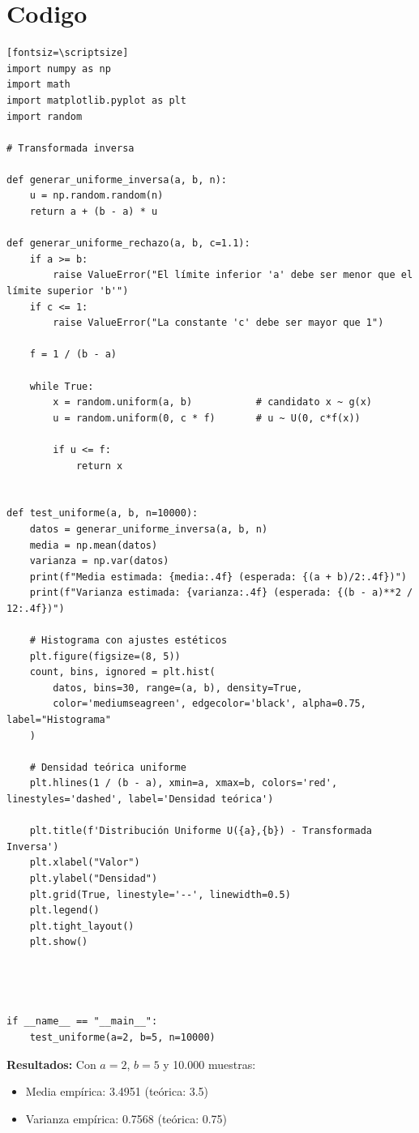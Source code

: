 \documentclass{article}
\begin{document}
\section{Codigo}
    \begin{verbatim}[fontsiz=\scriptsize]
import numpy as np
import math
import matplotlib.pyplot as plt
import random

# Transformada inversa

def generar_uniforme_inversa(a, b, n):
    u = np.random.random(n)
    return a + (b - a) * u

def generar_uniforme_rechazo(a, b, c=1.1):
    if a >= b:
        raise ValueError("El límite inferior 'a' debe ser menor que el límite superior 'b'")
    if c <= 1:
        raise ValueError("La constante 'c' debe ser mayor que 1")

    f = 1 / (b - a)  

    while True:
        x = random.uniform(a, b)           # candidato x ~ g(x)
        u = random.uniform(0, c * f)       # u ~ U(0, c*f(x))

        if u <= f:
            return x  


def test_uniforme(a, b, n=10000):
    datos = generar_uniforme_inversa(a, b, n)
    media = np.mean(datos)
    varianza = np.var(datos)
    print(f"Media estimada: {media:.4f} (esperada: {(a + b)/2:.4f})")
    print(f"Varianza estimada: {varianza:.4f} (esperada: {(b - a)**2 / 12:.4f})")

    # Histograma con ajustes estéticos
    plt.figure(figsize=(8, 5))
    count, bins, ignored = plt.hist(
        datos, bins=30, range=(a, b), density=True,
        color='mediumseagreen', edgecolor='black', alpha=0.75, label="Histograma"
    )

    # Densidad teórica uniforme
    plt.hlines(1 / (b - a), xmin=a, xmax=b, colors='red', linestyles='dashed', label='Densidad teórica')

    plt.title(f'Distribución Uniforme U({a},{b}) - Transformada Inversa')
    plt.xlabel("Valor")
    plt.ylabel("Densidad")
    plt.grid(True, linestyle='--', linewidth=0.5)
    plt.legend()
    plt.tight_layout()
    plt.show()




if __name__ == "__main__":
    test_uniforme(a=2, b=5, n=10000)
    \end{verbatim}
\textbf{Resultados:} Con $a=2$, $b=5$ y 10.000 muestras:
\begin{itemize}
\item Media empírica: 3.4951 (teórica: 3.5)
\item Varianza empírica: 0.7568 (teórica: 0.75)
\end{itemize}
\end{document}

